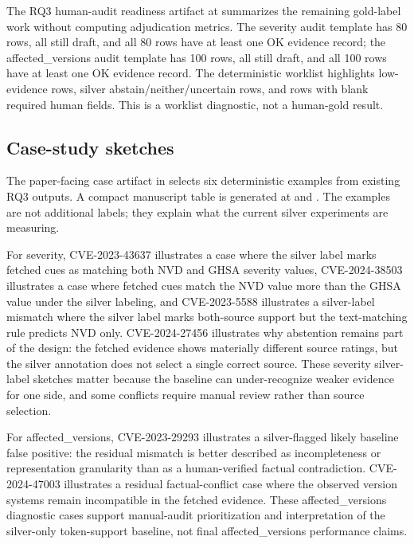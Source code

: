 The RQ3 human-audit readiness artifact at  summarizes the remaining gold-label work without computing adjudication metrics. The severity audit template has 80 rows, all still draft, and all 80 rows have at least one OK evidence record; the affected\_versions audit template has 100 rows, all still draft, and all 100 rows have at least one OK evidence record. The deterministic worklist highlights low-evidence rows, silver abstain/neither/uncertain rows, and rows with blank required human fields. This is a worklist diagnostic, not a human-gold result.

\subsection{Case-study sketches}

The paper-facing case artifact in  selects six deterministic examples from existing RQ3 outputs. A compact manuscript table is generated at  and . The examples are not additional labels; they explain what the current silver experiments are measuring.

For severity, CVE-2023-43637 illustrates a case where the silver label marks fetched cues as matching both NVD and GHSA severity values, CVE-2024-38503 illustrates a case where fetched cues match the NVD value more than the GHSA value under the silver labeling, and CVE-2023-5588 illustrates a silver-label mismatch where the silver label marks both-source support but the text-matching rule predicts NVD only. CVE-2024-27456 illustrates why abstention remains part of the design: the fetched evidence shows materially different source ratings, but the silver annotation does not select a single correct source. These severity silver-label sketches matter because the baseline can under-recognize weaker evidence for one side, and some conflicts require manual review rather than source selection.

For affected\_versions, CVE-2023-29293 illustrates a silver-flagged likely baseline false positive: the residual mismatch is better described as incompleteness or representation granularity than as a human-verified factual contradiction. CVE-2024-47003 illustrates a residual factual-conflict case where the observed version systems remain incompatible in the fetched evidence. These affected\_versions diagnostic cases support manual-audit prioritization and interpretation of the silver-only token-support baseline, not final affected\_versions performance claims.
